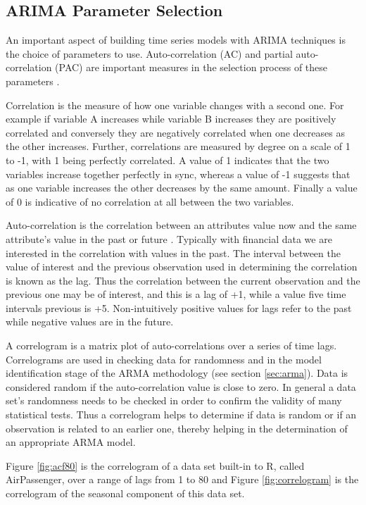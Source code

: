 \subsection{ARIMA Parameter Selection}
\label{sec:acf}
An important aspect of building time series models with ARIMA techniques is the choice of parameters to use. Auto-correlation (AC) and partial auto-correlation (PAC) are important measures in the selection process of these parameters \citep{mills2011}. 

Correlation is the measure of how one variable changes with a second one. For example if variable A increases while variable B increases they are positively correlated and conversely they are negatively correlated when one decreases as the other increases. Further, correlations are measured by degree on a scale of 1 to -1, with 1 being perfectly correlated. A value of 1 indicates that the two variables increase together perfectly in sync, whereas a value of -1 suggests that as one variable increases the other decreases by the same amount. Finally a value of 0 is indicative of no correlation at all between the two variables.

Auto-correlation is the correlation between an attributes value now and the same attribute's value in the past or future \citep{shumway2010time}. Typically with financial data we are interested in the correlation with values in the past. The interval between the value of interest and the previous observation used in determining the correlation is known as the lag. Thus the correlation between the current observation and the previous one may be of interest, and this is a lag of +1, while a value five time intervals previous is +5. Non-intuitively positive values for lags refer to the past while negative values are in the future. 

A correlogram is a matrix plot of auto-correlations over a series of time lags.  Correlograms are used in checking data for randomness and in the model identification stage of the ARMA methodology (see section \ref{sec:arma}). Data is considered random if the auto-correlation value is close to zero.  In general a data set's randomness needs to be checked in order to confirm the validity of many statistical tests. Thus a correlogram helps to determine if data is random or if an observation is related to an earlier one, thereby helping in the determination of an appropriate ARMA model. 

Figure \ref{fig:acf80} is the correlogram of a data set built-in to R, called AirPassenger, over a range of lags from 1 to 80 and Figure \ref{fig:correlogram} is the correlogram of the seasonal component of this data set.

